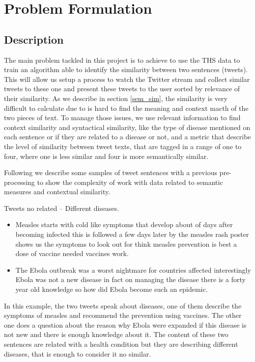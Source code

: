 \documentclass[12pt]{report}
\begin{document}
\chapter{Problem Formulation} \label{chapter 3}
\section{Description}
The main problem tackled in this project is to achieve to use the \ac{THS} data to train an algorithm able to identify the similarity between two sentences (tweets). This will allow us setup a process to watch the Twitter stream and collect similar tweets to these one and present these tweets to the user sorted by relevance of their similarity. As we describe in section \ref{sem_sim}, the similarity is very difficult to calculate due to is hard to find the meaning and context macth of the two pieces of text. To manage those issues, we use relevant information to find context similarity and syntactical similarity, like the type of disease mentioned on each sentence or if they are related to a disease or not, and a metric that describe the level of similarity between tweet texts, that are tagged in a range of one to four, where one is less similar and four is more semantically similar.

Following we describe some samples of tweet sentences with a previous pre-processing to show the complexity of work with data related to semantic measures and contextual similarity.

\begin{definition} Tweets no related – Different diseases.
	\begin{itemize}[nolistsep]
		\item Measles starts with cold like symptoms that develop about of days after becoming infected this is followed a few days later by the measles rash poster shows us the symptoms to look out for think measles prevention is best a dose of vaccine needed vaccines work.
		\item The Ebola outbreak was a worst nightmare for countries affected interestingly Ebola was not a new disease in fact on managing the disease there is a forty year old knowledge so how did Ebola become such an epidemic.
	\end{itemize}
\end{definition}
In this example, the two tweets speak about diseases, one of them describe the symptoms of measles and recommend the prevention using vaccines. The other one does a question about the reason why Ebola were expanded if this disease is not new and there is enough knowledge about it.  The content of these two sentences are related with a health condition but they are describing different diseases, that is enough to consider it no similar.
\end{document}
